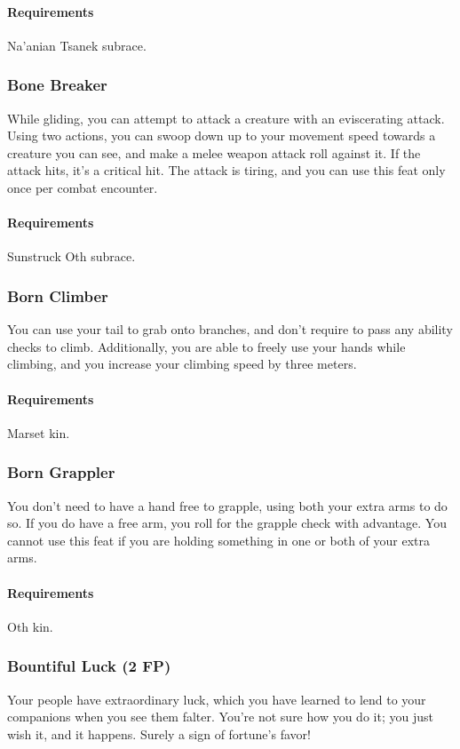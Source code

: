     \paragraph{Requirements} Na'anian Tsanek subrace.
\subsubsection{Bone Breaker} \label{feat::bonebreaker}
    While gliding, you can attempt to attack a creature with an eviscerating attack.
    Using two actions, you can swoop down up to your movement speed towards a creature you can see, and make a melee weapon attack roll against it.
    If the attack hits, it's a critical hit.
    The attack is tiring, and you can use this feat only once per combat encounter.
    \paragraph{Requirements} Sunstruck Oth subrace.
\subsubsection{Born Climber} \label{feat::bornclimber}
    You can use your tail to grab onto branches, and don't require to pass any ability checks to climb.
    Additionally, you are able to freely use your hands while climbing, and you increase your climbing speed by three meters.
    \paragraph{Requirements} Marset kin.
\subsubsection{Born Grappler} \label{feat::borngrappler}
    You don't need to have a hand free to grapple, using both your extra arms to do so.
    If you do have a free arm, you roll for the grapple check with advantage.
    You cannot use this feat if you are holding something in one or both of your extra arms.
    \paragraph{Requirements} Oth kin.
\subsubsection{Bountiful Luck (2 FP)} \label{feat::bountifulluck}
    Your people have extraordinary luck, which you have learned to lend to your companions when you see them falter.
    You're not sure how you do it; you just wish it, and it happens.
    Surely a sign of fortune's favor!

